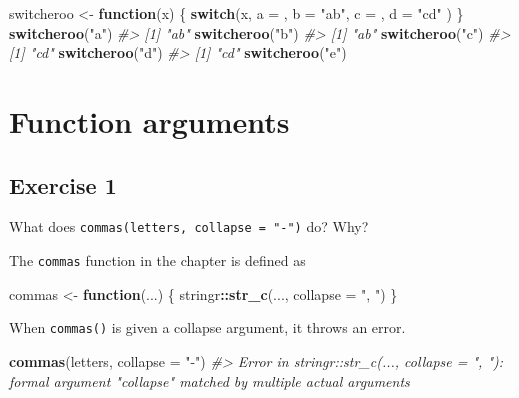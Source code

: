 \documentclass[]{book}
\newenvironment{Shaded}{\begin{snugshade}}{\end{snugshade}}
\newcommand{\CommentTok}[1]{\textcolor[rgb]{0.56,0.35,0.01}{\textit{#1}}}
\newcommand{\ControlFlowTok}[1]{\textcolor[rgb]{0.13,0.29,0.53}{\textbf{#1}}}
\newcommand{\DataTypeTok}[1]{\textcolor[rgb]{0.13,0.29,0.53}{#1}}
\newcommand{\KeywordTok}[1]{\textcolor[rgb]{0.13,0.29,0.53}{\textbf{#1}}}
\newcommand{\NormalTok}[1]{#1}
\newcommand{\OperatorTok}[1]{\textcolor[rgb]{0.81,0.36,0.00}{\textbf{#1}}}
\newcommand{\StringTok}[1]{\textcolor[rgb]{0.31,0.60,0.02}{#1}}
\theoremstyle{definition}
\theoremstyle{definition}
\theoremstyle{definition}
\theoremstyle{remark}
\begin{document}
\begin{Shaded}
\begin{Highlighting}[]
\NormalTok{switcheroo <-}\StringTok{ }\ControlFlowTok{function}\NormalTok{(x) \{}
  \ControlFlowTok{switch}\NormalTok{(x, }
  \DataTypeTok{a =}\NormalTok{ ,}
  \DataTypeTok{b =} \StringTok{"ab"}\NormalTok{,}
  \DataTypeTok{c =}\NormalTok{ ,}
  \DataTypeTok{d =} \StringTok{"cd"}
\NormalTok{  )}
\NormalTok{\}}
\KeywordTok{switcheroo}\NormalTok{(}\StringTok{"a"}\NormalTok{)}
\CommentTok{#> [1] "ab"}
\KeywordTok{switcheroo}\NormalTok{(}\StringTok{"b"}\NormalTok{)}
\CommentTok{#> [1] "ab"}
\KeywordTok{switcheroo}\NormalTok{(}\StringTok{"c"}\NormalTok{)}
\CommentTok{#> [1] "cd"}
\KeywordTok{switcheroo}\NormalTok{(}\StringTok{"d"}\NormalTok{)}
\CommentTok{#> [1] "cd"}
\KeywordTok{switcheroo}\NormalTok{(}\StringTok{"e"}\NormalTok{)}
\end{Highlighting}
\end{Shaded}

\hypertarget{function-arguments}{%
\section{Function arguments}\label{function-arguments}}

\hypertarget{exercise-1-47}{%
\subsection{Exercise 1}\label{exercise-1-47}}

What does \texttt{commas(letters,\ collapse\ =\ "-")} do? Why?

The \texttt{commas} function in the chapter is defined as

\begin{Shaded}
\begin{Highlighting}[]
\NormalTok{commas <-}\StringTok{ }\ControlFlowTok{function}\NormalTok{(...) \{}
\NormalTok{  stringr}\OperatorTok{::}\KeywordTok{str_c}\NormalTok{(..., }\DataTypeTok{collapse =} \StringTok{", "}\NormalTok{)}
\NormalTok{\}}
\end{Highlighting}
\end{Shaded}

When \texttt{commas()} is given a collapse argument, it throws an error.

\begin{Shaded}
\begin{Highlighting}[]
\KeywordTok{commas}\NormalTok{(letters, }\DataTypeTok{collapse =} \StringTok{"-"}\NormalTok{)}
\CommentTok{#> Error in stringr::str_c(..., collapse = ", "): formal argument "collapse" matched by multiple actual arguments}
\end{Highlighting}
\end{Shaded}
\end{document}
